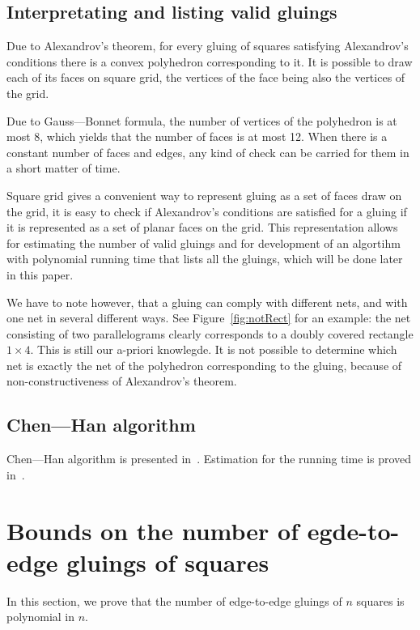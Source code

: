 \documentclass[a4paper,11pt]{article}
\begin{document}
\subsection{Interpretating and listing valid gluings}

Due to Alexandrov's theorem, for every gluing of squares satisfying Alexandrov's conditions there is a convex polyhedron corresponding to it. It is possible to draw each of its faces on square grid, the vertices of the face being also the vertices of the grid.

Due to Gauss—Bonnet formula, the number of vertices of the polyhedron is at most 8, which yields that the number of faces is at most 12. When there is a constant number of faces and edges, any kind of check can be carried for them in a short matter of time.

Square grid gives a convenient way to represent gluing as a set of faces draw on the grid, it is easy to check if Alexandrov's conditions are satisfied for a gluing if it is represented as a set of planar faces on the grid. This representation allows for estimating the number of valid gluings and for development of an algortihm with polynomial running time that lists all the gluings, which will be done later in this paper.

We have to note however, that a gluing can comply with different nets, and with one net in several different ways. See Figure~\ref{fig:notRect} for an example: the net consisting of two parallelograms clearly corresponds to a doubly covered rectangle $1 \times 4$. This is still our a-priori knowlegde. It is not possible to determine which net is exactly the net of the polyhedron corresponding to the gluing, because of non-constructiveness of Alexandrov's theorem.

\subsection{Chen—Han algorithm}

Chen—Han algorithm is presented in~\cite{chen-han}. Estimation for the running time is proved in~\cite{z-bachthesis}.

\section{Bounds on the number of egde-to-edge gluings of squares}

In this section, we prove that the number of edge-to-edge gluings of $n$ squares is polynomial in $n$.
\end{document}
